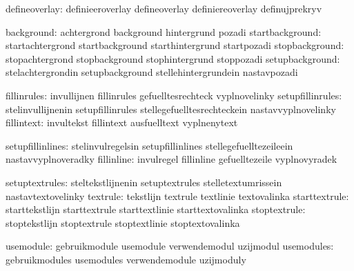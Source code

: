                 defineoverlay:  definieeroverlay             defineoverlay
                                definiereoverlay             definujprekryv

                   background:  achtergrond                  background
                                hintergrund                  pozadi
              startbackground:  startachtergrond             startbackground
                                starthintergrund             startpozadi
               stopbackground:  stopachtergrond              stopbackground
                                stophintergrund              stoppozadi
              setupbackground:  stelachtergrondin            setupbackground
                                stellehintergrundein         nastavpozadi

                  fillinrules:  invullijnen                  fillinrules
                                gefuelltesrechteck           vyplnovelinky %
             setupfillinrules:  stelinvullijnenin            setupfillinrules
                                stellegefuelltesrechteckein  nastavvyplnovelinky
                   fillintext:  invultekst                   fillintext
                                ausfuelltext                 vyplnenytext

             setupfillinlines:  stelinvulregelsin            setupfillinlines
                                stellegefuelltezeileein      nastavvyplnoveradky
                   fillinline:  invulregel                   fillinline
                                gefuelltezeile               vyplnovyradek

               setuptextrules:  steltekstlijnenin            setuptextrules
                                stelletextumrissein          nastavtextovelinky
                     textrule:  tekstlijn                    textrule
                                textlinie                    textovalinka
                starttextrule:  starttekstlijn               starttextrule
                                starttextlinie               starttextovalinka
                 stoptextrule:  stoptekstlijn                stoptextrule
                                stoptextlinie                stoptextovalinka

                    usemodule:  gebruikmodule                usemodule
                                verwendemodul                uzijmodul
                   usemodules:  gebruikmodules               usemodules
                                verwendemodule               uzijmoduly

